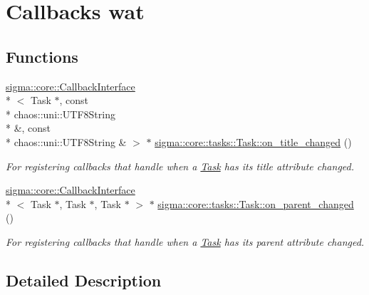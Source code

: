 \hypertarget{group___member}{\section{Callbacks wat}
\label{group___member}
}
\subsection*{Functions}
\begin{DoxyCompactItemize}
\item 
\hyperlink{classsigma_1_1core_1_1_callback_interface}{sigma\-::core\-::\-Callback\-Interface}\\*
$<$ Task $\ast$, const \\*
chaos\-::uni\-::\-U\-T\-F8\-String \\*
\&, const \\*
chaos\-::uni\-::\-U\-T\-F8\-String \& $>$ $\ast$ \hyperlink{group___member_gafb01222cabc945022f095921437a10a0}{sigma\-::core\-::tasks\-::\-Task\-::on\-\_\-title\-\_\-changed} ()
\begin{DoxyCompactList}\small\item\em For registering callbacks that handle when a \hyperlink{classsigma_1_1core_1_1tasks_1_1_task}{Task} has its title attribute changed. \end{DoxyCompactList}\item 
\hyperlink{classsigma_1_1core_1_1_callback_interface}{sigma\-::core\-::\-Callback\-Interface}\\*
$<$ Task $\ast$, Task $\ast$, Task $\ast$ $>$ $\ast$ \hyperlink{group___member_ga4947e26b1208f36cf4bab3f2091db786}{sigma\-::core\-::tasks\-::\-Task\-::on\-\_\-parent\-\_\-changed} ()
\begin{DoxyCompactList}\small\item\em For registering callbacks that handle when a \hyperlink{classsigma_1_1core_1_1tasks_1_1_task}{Task} has its parent attribute changed. \end{DoxyCompactList}\end{DoxyCompactItemize}


\subsection{Detailed Description}


